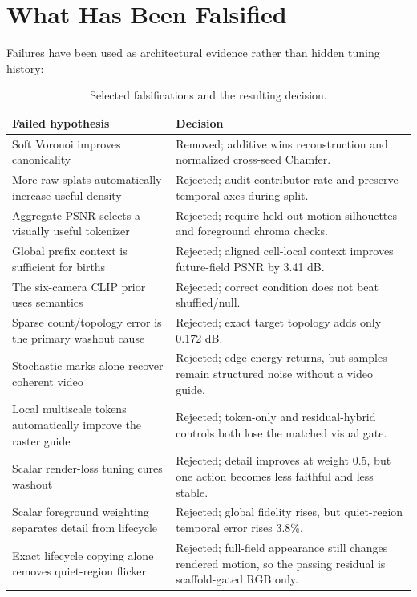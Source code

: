 \documentclass[10pt]{article}
\begin{document}
\clearpage
\section{What Has Been Falsified}

Failures have been used as architectural evidence rather than hidden tuning history:

\begin{table}[H]
\centering
\small
\caption{Selected falsifications and the resulting decision.}
\label{tab:falsified}
\begin{tabularx}{\linewidth}{@{}XX@{}}
\toprule
Failed hypothesis & Decision \\
\midrule
Soft Voronoi improves canonicality & Removed; additive wins reconstruction and normalized cross-seed Chamfer. \\
More raw splats automatically increase useful density & Rejected; audit contributor rate and preserve temporal axes during split. \\
Aggregate PSNR selects a visually useful tokenizer & Rejected; require held-out motion silhouettes and foreground chroma checks. \\
Global prefix context is sufficient for births & Rejected; aligned cell-local context improves future-field PSNR by 3.41 dB. \\
The six-camera CLIP prior uses semantics & Rejected; correct condition does not beat shuffled/null. \\
Sparse count/topology error is the primary washout cause & Rejected; exact target topology adds only 0.172 dB. \\
Stochastic marks alone recover coherent video & Rejected; edge energy returns, but samples remain structured noise without a video guide. \\
Local multiscale tokens automatically improve the raster guide & Rejected; token-only and residual-hybrid controls both lose the matched visual gate. \\
Scalar render-loss tuning cures washout & Rejected; detail improves at weight 0.5, but one action becomes less faithful and less stable. \\
Scalar foreground weighting separates detail from lifecycle & Rejected; global fidelity rises, but quiet-region temporal error rises 3.8\%. \\
Exact lifecycle copying alone removes quiet-region flicker & Rejected; full-field appearance still changes rendered motion, so the passing residual is scaffold-gated RGB only. \\

\end{tabularx}
\end{table}
\end{document}

